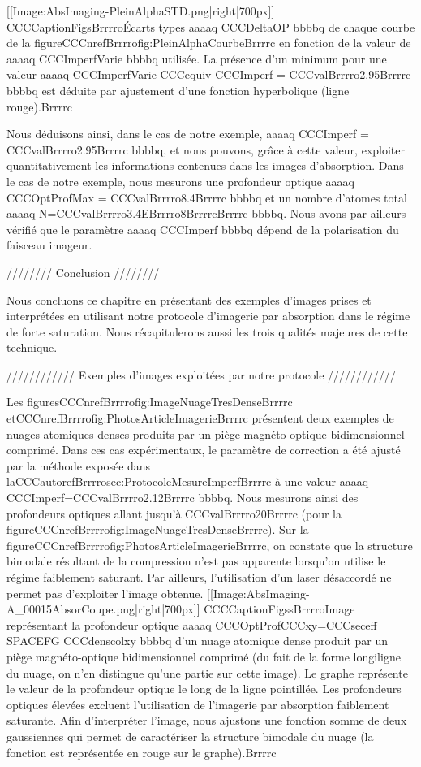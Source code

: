 [[Image:AbsImaging-PleinAlphaSTD.png|right|700px]]
CCCCaptionFigsBrrrroÉcarts types aaaaq CCCDeltaOP bbbbq de chaque courbe de la figureCCCnrefBrrrrofig:PleinAlphaCourbeBrrrrc en fonction de la valeur de aaaaq CCCImperfVarie bbbbq utilisée. La présence d'un minimum pour une valeur aaaaq CCCImperfVarie CCCequiv CCCImperf = CCCvalBrrrro2.95Brrrrc bbbbq est déduite par ajustement d'une fonction hyperbolique (ligne rouge).Brrrrc


Nous déduisons ainsi, dans le cas de notre exemple, aaaaq CCCImperf = CCCvalBrrrro2.95Brrrrc bbbbq, et nous pouvons, grâce à cette valeur, exploiter quantitativement les informations contenues dans les images d'absorption. Dans le cas de notre exemple, nous mesurons une profondeur optique aaaaq CCCOptProfMax = CCCvalBrrrro8.4Brrrrc bbbbq et un nombre d'atomes total aaaaq N=CCCvalBrrrro3.4EBrrrro8BrrrrcBrrrrc bbbbq.
Nous avons par ailleurs vérifié que le paramètre aaaaq CCCImperf bbbbq dépend de la polarisation du faisceau imageur.


//////// Conclusion ////////

Nous concluons ce chapitre en présentant des exemples d'images prises et interprétées en utilisant notre protocole d'imagerie par absorption dans le régime de forte saturation. Nous récapitulerons aussi les trois qualités majeures de cette technique.

//////////// Exemples d'images exploitées par notre protocole ////////////

Les figuresCCCnrefBrrrrofig:ImageNuageTresDenseBrrrrc etCCCnrefBrrrrofig:PhotosArticleImagerieBrrrrc présentent deux exemples de nuages atomiques denses produits par un piège magnéto-optique bidimensionnel comprimé. Dans ces cas expérimentaux, le paramètre de correction a été ajusté par la méthode exposée dans laCCCautorefBrrrrosec:ProtocoleMesureImperfBrrrrc à une valeur aaaaq CCCImperf=CCCvalBrrrro2.12Brrrrc bbbbq. Nous mesurons ainsi des profondeurs optiques allant jusqu'à CCCvalBrrrro20Brrrrc (pour la figureCCCnrefBrrrrofig:ImageNuageTresDenseBrrrrc). 
Sur la figureCCCnrefBrrrrofig:PhotosArticleImagerieBrrrrc, on constate que la structure bimodale résultant de la compression n'est pas apparente lorsqu'on utilise le régime faiblement saturant. Par ailleurs, l'utilisation d'un laser désaccordé ne permet pas d'exploiter l'image obtenue.
[[Image:AbsImaging-A_00015AbsorCoupe.png|right|700px]]
CCCCaptionFigssBrrrroImage représentant la profondeur optique aaaaq CCCOptProfCCCxy=CCCseceff SPACEFG CCCdenscolxy bbbbq d'un nuage atomique dense produit par un piège magnéto-optique bidimensionnel comprimé (du fait de la forme longiligne du nuage, on n'en distingue qu'une partie sur cette image). Le graphe représente le valeur de la profondeur optique le long de la ligne pointillée. Les profondeurs optiques élevées excluent l'utilisation de l'imagerie par absorption faiblement saturante. Afin d'interpréter l'image, nous ajustons une fonction somme de deux gaussiennes qui permet de caractériser la structure bimodale du nuage (la fonction est représentée en rouge sur le graphe).Brrrrc


